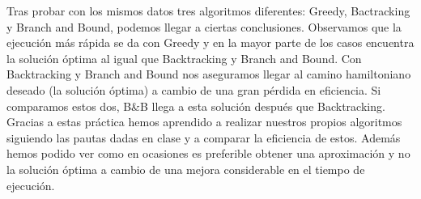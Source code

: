 \documentclass[a4]{article}
\begin{document}
Tras probar con los mismos datos tres algoritmos diferentes: Greedy,
Bactracking y Branch and Bound, podemos llegar a ciertas
conclusiones. Observamos que la ejecución más rápida se da con Greedy
y en la mayor parte de los casos encuentra la solución óptima al igual
que Backtracking y Branch and Bound. Con Backtracking y Branch and
Bound nos aseguramos llegar al camino hamiltoniano deseado (la
solución óptima) a cambio de una gran pérdida en eficiencia. Si
comparamos estos dos, B\&B llega a esta solución después que
Backtracking. Gracias a estas práctica hemos aprendido a realizar
nuestros propios algoritmos siguiendo las pautas dadas en clase y a
comparar la eficiencia de estos. Además hemos podido ver como en
ocasiones es preferible obtener una aproximación y no la solución
óptima a cambio de una mejora considerable en el tiempo de ejecución.
\end{document}
